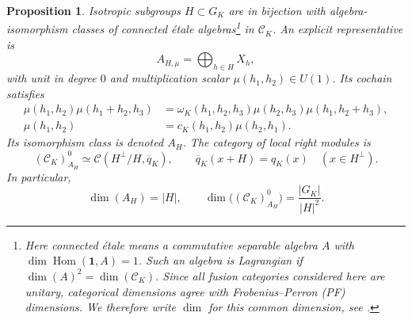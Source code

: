 \documentclass[12pt]{amsart}
\numberwithin{equation}{section}
\newtheorem{prop}[theorem]{Proposition}
\theoremstyle{definition}
\DeclareMathOperator{\Hom}{Hom}
\begin{document}
\begin{prop}
\label{prop:defects-etale}
Isotropic subgroups $H\subset G_K$ are in bijection with
algebra-isomorphism classes of connected \'etale algebras\footnote{Here \emph{connected \'etale} means a commutative separable
algebra $A$ with $\dim\Hom(\mathbf1,A)=1$. Such an algebra is
\emph{Lagrangian} if 
$\operatorname{dim}(A)^2=\operatorname{dim}(\mathcal C_K)$. Since all fusion categories considered here are unitary, categorical dimensions agree with Frobenius–Perron (PF) dimensions. We therefore write $\dim$ for this common dimension, see \cite[Sec.8.2]{ENO2005}.} in
$\mathcal C_K$. An explicit representative is
$$
A_{H,\mu}=\bigoplus_{h\in H}X_h,
$$
with unit in degree $0$ and multiplication scalar
$\mu(h_1,h_2)\in U(1)$. Its cochain satisfies
\begin{align}
\mu(h_1,h_2)\mu(h_1+h_2,h_3)
&=\omega_K(h_1,h_2,h_3)
\mu(h_2,h_3)\mu(h_1,h_2+h_3),
\label{eq:defects-associativity}\\
\mu(h_1,h_2)&=c_K(h_1,h_2)\mu(h_2,h_1).
\label{eq:defects-commutativity}
\end{align}
Its isomorphism class is denoted $A_H$. The category of local right
modules is
\begin{equation}
\label{eq:defects-local-modules}
(\mathcal C_K)^0_{A_H}\simeq
\mathcal C(H^\perp/H,\overline q_K),\qquad
\overline q_K(x+H)=q_K(x)\quad(x\in H^\perp).
\end{equation}
In particular,
$$
\operatorname{dim}(A_H)=|H|,\qquad
\operatorname{dim}\bigl((\mathcal C_K)^0_{A_H}\bigr)
=\frac{|G_K|}{|H|^2}.
$$
\end{prop}
\end{document}
